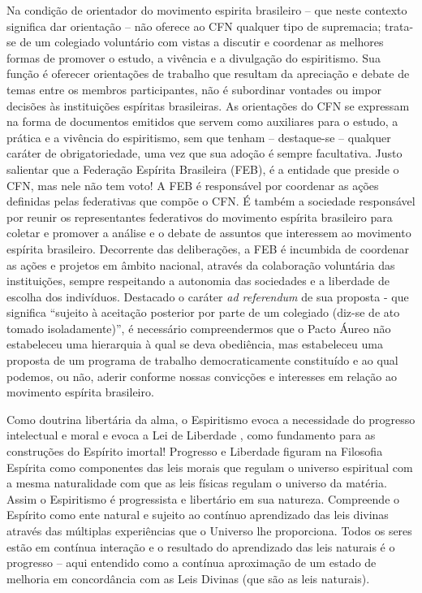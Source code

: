 Na condição de orientador do movimento espirita brasileiro -- que neste contexto significa dar orientação --  não oferece ao CFN qualquer tipo de supremacia; trata-se de um colegiado voluntário com vistas a discutir e coordenar as melhores formas de promover o estudo, a vivência e a divulgação do espiritismo. Sua função é oferecer orientações de trabalho que resultam da apreciação e debate de temas entre os membros participantes, não é subordinar vontades ou impor decisões às instituições espíritas brasileiras. As orientações do CFN se expressam na forma de documentos emitidos que servem como auxiliares para o estudo, a prática e a vivência do espiritismo, sem que tenham -- destaque-se -- qualquer caráter de obrigatoriedade, uma vez que sua adoção é sempre facultativa. Justo salientar que a Federação Espírita Brasileira (FEB), é a entidade que preside o CFN, mas nele não tem voto! A FEB é responsável por coordenar as ações definidas pelas federativas que compõe o CFN. É também a sociedade responsável por reunir os representantes federativos do movimento espírita brasileiro para coletar e promover a análise e o debate de assuntos que interessem ao movimento espírita brasileiro. Decorrente das deliberações, a FEB é incumbida de coordenar as ações e projetos em âmbito nacional, através da colaboração voluntária das instituições, sempre respeitando a autonomia das sociedades e a liberdade de escolha dos indivíduos. Destacado o caráter \emph{ad referendum} de sua proposta - que significa ``sujeito à aceitação posterior por parte de um colegiado (diz-se de ato tomado isoladamente)'', é necessário compreendermos que o Pacto Áureo não estabeleceu uma hierarquia à qual se deva obediência, mas estabeleceu uma proposta de um programa de trabalho democraticamente constituído e ao qual podemos, ou não, aderir conforme nossas convicções e interesses em relação ao movimento espírita brasileiro.   

Como doutrina libertária da alma, o Espiritismo evoca a necessidade do progresso intelectual e moral \cite[Parte III. Cap. VII ]{Kardec1857} e evoca a Lei de Liberdade \cite[Parte III. Cap.X]{Kardec1857}, como fundamento para as construções do Espírito imortal! Progresso e Liberdade figuram na Filosofia Espírita como componentes das leis morais que regulam o universo espiritual com a mesma naturalidade com que as leis físicas regulam o universo da matéria. Assim o Espiritismo é progressista e libertário em sua natureza. Compreende o Espírito como ente natural e sujeito ao contínuo aprendizado das leis divinas através das múltiplas experiências que o Universo lhe proporciona. Todos os seres estão em contínua interação e o resultado do aprendizado das leis naturais é o progresso -- aqui entendido como a contínua aproximação de um estado de melhoria em concordância com as Leis Divinas (que são as leis naturais). 

